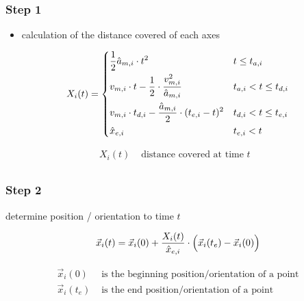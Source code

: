 \documentclass[%
  professionalfonts,%
  xcolor={%
    usenames,%
    dvipsnames,%
    svgnames,%
    table,%
    hyperref%
  }%
]{beamer}
\begin{document}
\subsubsection{Step 1}
\begin{frame}
\begin{itemize}
  \item calculation of the distance covered of each axes
\end{itemize}
\begin{equation*}
X_{i}(t) = 
\begin{dcases}
\frac{1}{2} \hat{a}_{m,i} \cdot t^2  & t \leq t_{a,i} \\
v_{m,i} \cdot t - \frac{1}{2} \cdot \frac{v_{m,i}^2}{\hat{a}_{m,i}} & t_{a,i} < t \leq t_{d,i} \\
v_{m,i} \cdot t_{d,i} - \frac{\hat{a}_{m,i}}{2} \cdot (t_{e,i} - t)^2 & t_{d,i} < t \leq t_{e,i}\\
\hat{x}_{e,i} & t_{e,i} < t\\
\end{dcases}
\end{equation*}

\begin{align*}
X_{i}(t) & \text{ distance covered at time $t$ } \\
\end{align*}
\end{frame}

\subsubsection{Step 2}
\begin{frame}
determine position / orientation to time $t$

\begin{equation*}
\vec{x}_{i}(t) = \vec{x}_{i}(0) + \frac{X_{i}(t)}{\hat{x}_{e,i}} \cdot \Bigl(\vec{x}_{i}(t_{e}) - \vec{x}_{i}(0) \Bigr)
\end{equation*}

\begin{align*}
\vec{x}_{i}(0)     & \text{ is the beginning position/orientation of a point} \\
\vec{x}_{i}(t_{e}) & \text{ is the end position/orientation of a point} \\
\end{align*}
\end{frame}
\end{document}
